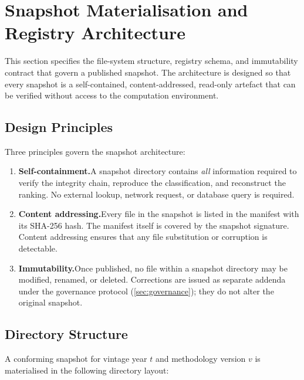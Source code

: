 \section{Snapshot Materialisation and Registry Architecture}%
\label{sec:snapshot-architecture}

This section specifies the file-system structure, registry schema, and
immutability contract that govern a published \ISI snapshot.  The
architecture is designed so that every snapshot is a self-contained,
content-addressed, read-only artefact that can be verified without access
to the computation environment.

\subsection{Design Principles}\label{sec:snapshot:principles}

Three principles govern the snapshot architecture:

\begin{enumerate}[label=\textbf{S-\arabic*}.]
  \item \textbf{Self-containment.}\enspace  A snapshot directory contains
    \emph{all} information required to verify the integrity chain, reproduce
    the classification, and reconstruct the ranking.  No external lookup,
    network request, or database query is required.
  \item \textbf{Content addressing.}\enspace  Every file in the snapshot
    is listed in the manifest with its SHA-256 hash.  The manifest itself
    is covered by the snapshot signature.  Content addressing ensures that
    any file substitution or corruption is detectable.
  \item \textbf{Immutability.}\enspace  Once published, no file within a
    snapshot directory may be modified, renamed, or deleted.  Corrections
    are issued as separate addenda under the governance protocol
    (\cref{sec:governance}); they do not alter the original snapshot.
\end{enumerate}

\subsection{Directory Structure}\label{sec:snapshot:directory}

A conforming snapshot for vintage year \(t\) and methodology version
\(v\) is materialised in the following directory layout:

